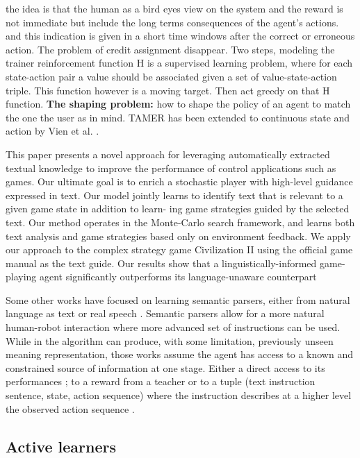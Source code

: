 \cite{knox2009interactively} the idea is that the human as a bird eyes view on the system and the reward is not immediate but include the long terms consequences of the agent's actions. and this indication is given in a short time windows after the correct or erroneous action. The problem of credit assignment disappear.
Two steps, modeling the trainer reinforcement function H is a supervised learning problem, where for each state-action pair a value should be associated given a set of value-state-action triple. This function however is a moving target. Then act greedy on that H function.
\textbf{The shaping problem:} how to shape the policy of an agent to match the one the user as in mind. TAMER has been extended to continuous state and action by Vien et al. \cite{vien2013learning}.

\cite{branavan2011learning} This paper presents a novel approach for leveraging automatically extracted textual knowledge to improve the performance of control applications such as games. Our ultimate goal is to enrich a stochastic player with high-level guidance expressed in text. Our model jointly learns to identify text that is relevant to a given game state in addition to learn- ing game strategies guided by the selected text. Our method operates in the Monte-Carlo search framework, and learns both text analysis and game strategies based only on environment feedback. We apply our approach to the complex strategy game Civilization II using the official game manual as the text guide. Our results show that a linguistically-informed game-playing agent significantly outperforms its language-unaware counterpart

Some other works have focused on learning semantic parsers, either from natural language as text \cite{branavan2011learning,kim2012unsupervised} or real speech \cite{doshi2008spoken}. Semantic parsers allow for a more natural human-robot interaction where more advanced set of instructions can be used. While in \cite{kim2012unsupervised} the algorithm can produce, with some limitation, previously unseen meaning representation, those works assume the agent has access to a known and constrained source of information at one stage. Either a direct access to its performances \cite{branavan2011learning}; to a reward from a teacher \cite{doshi2008spoken} or to a tuple (text instruction sentence, state, action sequence) where the instruction describes at a higher level the observed action sequence \cite{kim2012unsupervised}.

\subsection{Active learners}

